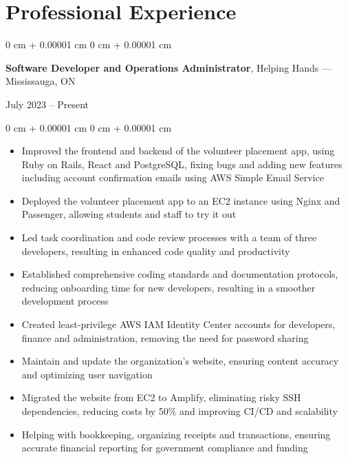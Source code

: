 \documentclass[10pt, letterpaper]{article}
\newenvironment{highlights}{
    \begin{itemize}[
        topsep=0.10 cm,
        parsep=0.10 cm,
        partopsep=0pt,
        itemsep=0pt,
        leftmargin=0 cm + 10pt
    ]
}{
    \end{itemize}
} %
\newenvironment{onecolentry}{
    \begin{adjustwidth}{
        0 cm + 0.00001 cm
    }{
        0 cm + 0.00001 cm
    }
}{
    \end{adjustwidth}
} %
\newenvironment{twocolentry}[2][]{
    \onecolentry
    \def\secondColumn{#2}
    \setcolumnwidth{\fill, 4 cm}
    \begin{paracol}{2}
}{
    \switchcolumn \raggedleft \secondColumn
    \end{paracol}
    \endonecolentry
} %
\begin{document}
    \section{Professional Experience}
        \begin{twocolentry}{July 2023 -- Present}
            \textbf{Software Developer and Operations Administrator}, Helping Hands --- Mississauga, ON
        \end{twocolentry}
        \vspace{0.10 cm}
        \begin{onecolentry}
            \begin{highlights}
                \item Improved the frontend and backend of the volunteer placement app, using Ruby on Rails, React and PostgreSQL, fixing bugs and adding new features including account confirmation emails using AWS Simple Email Service
                \item Deployed the volunteer placement app to an EC2 instance using Nginx and Passenger, allowing students and staff to try it out
                \item Led task coordination and code review processes with a team of three developers, resulting in enhanced code quality and productivity
                \item Established comprehensive coding standards and documentation protocols, reducing onboarding time for new developers, resulting in a smoother development process
                \item Created least-privilege AWS IAM Identity Center accounts for developers, finance and administration, removing the need for password sharing
                \item Maintain and update the organization's website, ensuring content accuracy and optimizing user navigation
                \item Migrated the website from EC2 to Amplify, eliminating risky SSH dependencies, reducing costs by 50\% and improving CI/CD and scalability
                \item Helping with bookkeeping, organizing receipts and transactions, ensuring accurate financial reporting for government compliance and funding
            \end{highlights}
        \end{onecolentry}
        \vspace{0.5 cm}
\end{document}
